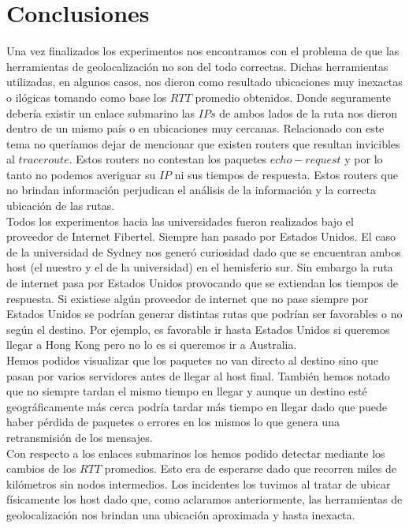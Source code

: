 \section{Conclusiones}
Una vez finalizados los experimentos nos encontramos con el problema de que las herramientas de geolocalización no son del todo correctas. 
Dichas herramientas utilizadas, en algunos casos, nos dieron como resultado ubicaciones muy inexactas o ilógicas tomando como base los $RTT$ promedio obtenidos. 
Donde seguramente debería existir un enlace submarino las $IPs$ de ambos lados de la ruta nos dieron dentro de un mismo país o en ubicaciones muy cercanas. 
Relacionado con este tema no queríamos dejar de mencionar que existen routers que resultan invicibles al $traceroute$. Estos routers no contestan los paquetes 
$echo-request$ y por lo tanto no podemos averiguar su $IP$ ni sus tiempos de respuesta. Estos routers que no brindan información perjudican el análisis de la 
información y la correcta ubicación de las rutas.\\

Todos los experimentos hacia las universidades fueron realizados bajo el proveedor de Internet Fibertel. Siempre han pasado por Estados Unidos.
El caso de la universidad de Sydney nos generó curiosidad dado que se encuentran ambos host (el nuestro y el de la universidad) en el hemisferio sur. 
Sin embargo la ruta de internet pasa por Estados Unidos provocando que se extiendan los tiempos de respuesta. Si existiese algún proveedor de internet que no 
pase siempre por Estados Unidos se podrían generar distintas rutas que podrían ser favorables o no según el destino. Por ejemplo, es favorable ir hasta Estados Unidos 
si queremos llegar a Hong Kong pero no lo es si queremos ir a Australia.\\

Hemos podidos visualizar que los paquetes no van directo al destino sino que pasan por varios servidores antes de llegar al host final. 
También hemos notado que no siempre tardan el mismo tiempo en llegar y aunque un destino esté geográficamente más cerca podría tardar más tiempo en llegar 
dado que puede haber pérdida de paquetes o errores en los mismos lo que genera una retransmisión de los mensajes.\\  

Con respecto a los enlaces submarinos los hemos podido detectar mediante los cambios de los $RTT$ promedios. 
Esto era de esperarse dado que recorren miles de kilómetros sin nodos intermedios. Los incidentes los tuvimos al tratar de ubicar 
físicamente los host dado que, como aclaramos anteriormente, las herramientas de geolocalización nos brindan una ubicación aproximada y hasta inexacta.\\

